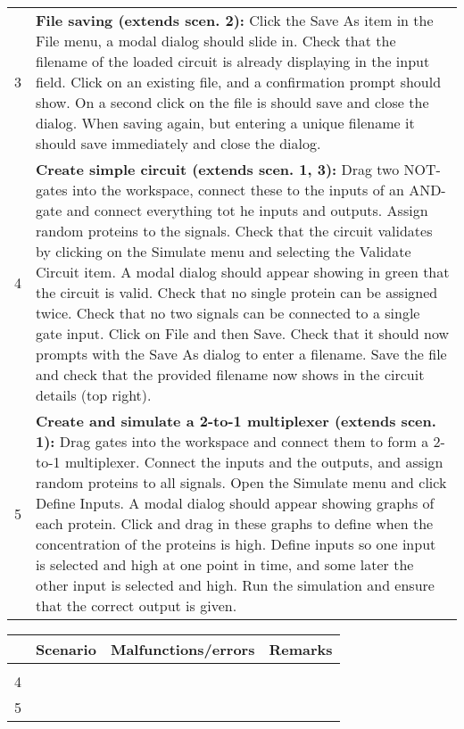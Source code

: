 \documentclass{article}
\begin{document}
\begin{center}
\begin{tabularx}{\textwidth}{r p{15cm}}
3 & \textbf{File saving (extends scen. 2):} Click the Save As item in the File menu,  a modal dialog should slide in. Check that the filename of the loaded circuit is already displaying in the input field. Click on an existing file, and a confirmation prompt should show.
On a second click on the file is should save and close the dialog. When saving again, but entering a unique filename it should save immediately and close the dialog.\\
4 & \textbf{Create simple circuit (extends scen. 1, 3):} Drag two NOT-gates into the workspace, connect these to the inputs of an AND-gate and connect everything tot he inputs and outputs. Assign random proteins to the signals. Check that the circuit validates by clicking on the Simulate menu and selecting the Validate Circuit item. A modal dialog should appear showing in green that the circuit is valid. Check that no single protein can be assigned twice. Check that no two signals can be connected to a single gate input. Click on File and then Save. Check that it should now prompts with the Save As dialog to enter a filename. Save the file and check that the provided filename now shows in the circuit details (top right).\\
5 & \textbf{Create and simulate a 2-to-1 multiplexer (extends scen. 1):} Drag gates into the workspace and connect them to form a 2-to-1 multiplexer. Connect the inputs and the outputs, and assign random proteins to all signals. Open the Simulate menu and click Define Inputs. A modal dialog should appear showing graphs of each protein. Click and drag in these graphs to define when the concentration of the proteins is high. Define inputs so one input is selected and high at one point in time, and some later the other input is selected and high. Run the simulation and ensure that the correct output is given. \\

\end{tabularx}
\end{center}

\newpage

\begin{center}
\begin{tabularx}{\textwidth}{r p{8cm} | l | l}
& \textbf{Scenario} & Malfunctions/errors & Remarks \\\hline
& 
& & \\
4 & 
& & \\
5 & & & \\
\end{tabularx}
\end{center}
\end{document}
